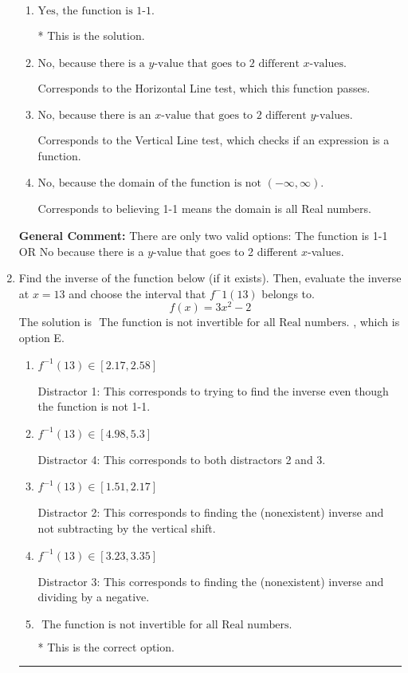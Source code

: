 \documentclass{extbook}[14pt]
\newcommand{\litem}[1]{\item #1

\rule{\textwidth}{0.4pt}}
\begin{document}
\begin{enumerate}
{\begin{enumerate}[label=\Alph*.]
Corresponds to believing 1-1 means the range is all Real numbers.
\item \( \text{Yes, the function is 1-1.} \)

* This is the solution.
\item \( \text{No, because there is a $y$-value that goes to 2 different $x$-values.} \)

Corresponds to the Horizontal Line test, which this function passes.
\item \( \text{No, because there is an $x$-value that goes to 2 different $y$-values.} \)

Corresponds to the Vertical Line test, which checks if an expression is a function.
\item \( \text{No, because the domain of the function is not $(-\infty, \infty)$.} \)

Corresponds to believing 1-1 means the domain is all Real numbers.
\end{enumerate}

\textbf{General Comment:} There are only two valid options: The function is 1-1 OR No because there is a $y$-value that goes to 2 different $x$-values.
}
\litem{
Find the inverse of the function below (if it exists). Then, evaluate the inverse at $x = 13$ and choose the interval that $f^-1(13)$ belongs to.
\[ f(x) = 3 x^2 - 2 \]The solution is \( \text{ The function is not invertible for all Real numbers. } \), which is option E.\begin{enumerate}[label=\Alph*.]
\item \( f^{-1}(13) \in [2.17, 2.58] \)

 Distractor 1: This corresponds to trying to find the inverse even though the function is not 1-1. 
\item \( f^{-1}(13) \in [4.98, 5.3] \)

 Distractor 4: This corresponds to both distractors 2 and 3.
\item \( f^{-1}(13) \in [1.51, 2.17] \)

 Distractor 2: This corresponds to finding the (nonexistent) inverse and not subtracting by the vertical shift.
\item \( f^{-1}(13) \in [3.23, 3.35] \)

 Distractor 3: This corresponds to finding the (nonexistent) inverse and dividing by a negative.
\item \( \text{ The function is not invertible for all Real numbers. } \)

* This is the correct option.
\end{enumerate}

}
\end{enumerate}
\end{document}
